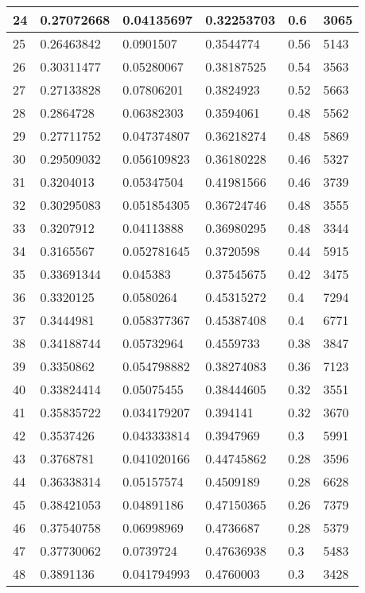 \begin{longtable}{|l|l|l|l|l|l|}
24 & 0.27072668 & 0.04135697 & 0.32253703 & 0.6 & 3065 \\ \hline 
25 & 0.26463842 & 0.0901507 & 0.3544774 & 0.56 & 5143 \\ \hline 
26 & 0.30311477 & 0.05280067 & 0.38187525 & 0.54 & 3563 \\ \hline 
27 & 0.27133828 & 0.07806201 & 0.3824923 & 0.52 & 5663 \\ \hline 
28 & 0.2864728 & 0.06382303 & 0.3594061 & 0.48 & 5562 \\ \hline 
29 & 0.27711752 & 0.047374807 & 0.36218274 & 0.48 & 5869 \\ \hline 
30 & 0.29509032 & 0.056109823 & 0.36180228 & 0.46 & 5327 \\ \hline 
31 & 0.3204013 & 0.05347504 & 0.41981566 & 0.46 & 3739 \\ \hline 
32 & 0.30295083 & 0.051854305 & 0.36724746 & 0.48 & 3555 \\ \hline 
33 & 0.3207912 & 0.04113888 & 0.36980295 & 0.48 & 3344 \\ \hline 
34 & 0.3165567 & 0.052781645 & 0.3720598 & 0.44 & 5915 \\ \hline 
35 & 0.33691344 & 0.045383 & 0.37545675 & 0.42 & 3475 \\ \hline 
36 & 0.3320125 & 0.0580264 & 0.45315272 & 0.4 & 7294 \\ \hline 
37 & 0.3444981 & 0.058377367 & 0.45387408 & 0.4 & 6771 \\ \hline 
38 & 0.34188744 & 0.05732964 & 0.4559733 & 0.38 & 3847 \\ \hline 
39 & 0.3350862 & 0.054798882 & 0.38274083 & 0.36 & 7123 \\ \hline 
40 & 0.33824414 & 0.05075455 & 0.38444605 & 0.32 & 3551 \\ \hline 
41 & 0.35835722 & 0.034179207 & 0.394141 & 0.32 & 3670 \\ \hline 
42 & 0.3537426 & 0.043333814 & 0.3947969 & 0.3 & 5991 \\ \hline 
43 & 0.3768781 & 0.041020166 & 0.44745862 & 0.28 & 3596 \\ \hline 
44 & 0.36338314 & 0.05157574 & 0.4509189 & 0.28 & 6628 \\ \hline 
45 & 0.38421053 & 0.04891186 & 0.47150365 & 0.26 & 7379 \\ \hline 
46 & 0.37540758 & 0.06998969 & 0.4736687 & 0.28 & 5379 \\ \hline 
47 & 0.37730062 & 0.0739724 & 0.47636938 & 0.3 & 5483 \\ \hline 
48 & 0.3891136 & 0.041794993 & 0.4760003 & 0.3 & 3428 \\ \hline 

\end{longtable}
